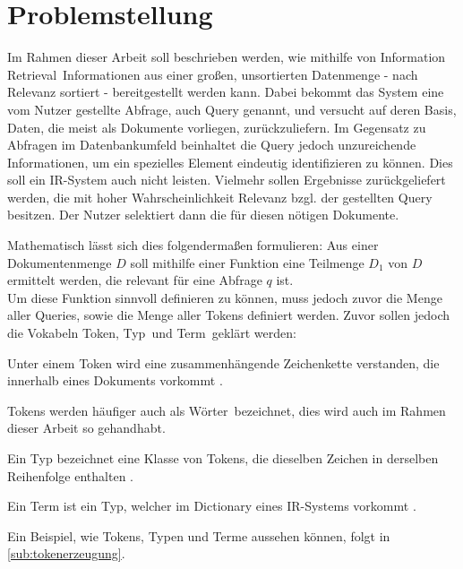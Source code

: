 \section{Problemstellung}
Im Rahmen dieser Arbeit soll beschrieben werden, wie mithilfe von \glqq Information Retrieval\grqq\ Informationen aus einer großen, unsortierten Datenmenge - nach Relevanz sortiert - bereitgestellt werden kann. Dabei bekommt das System eine vom Nutzer gestellte Abfrage, auch Query genannt, und versucht auf deren Basis, Daten, die meist als Dokumente vorliegen, zurückzuliefern. Im Gegensatz zu Abfragen im Datenbankumfeld beinhaltet die Query jedoch unzureichende Informationen, um ein spezielles Element eindeutig identifizieren zu können. Dies soll ein IR-System auch nicht leisten. Vielmehr sollen Ergebnisse zurückgeliefert werden, die mit hoher Wahrscheinlichkeit Relevanz bzgl. der gestellten Query besitzen. Der Nutzer selektiert dann die für diesen nötigen Dokumente.

Mathematisch lässt sich dies folgendermaßen formulieren: Aus einer Dokumentenmenge $D$ soll mithilfe einer Funktion eine Teilmenge $D_1$ von $D$ ermittelt werden, die relevant für eine Abfrage $q$ ist.
\\
Um diese Funktion sinnvoll definieren zu können, muss jedoch zuvor die Menge aller Queries, sowie die Menge aller Tokens definiert werden. Zuvor sollen jedoch die Vokabeln \glqq Token\grqq, \glqq Typ\grqq\ und \glqq Term\grqq\ geklärt werden:

\begin{defi}[Token]\label{def:Token}
	Unter einem Token wird eine zusammenhängende Zeichenkette verstanden, die innerhalb eines Dokuments vorkommt \cite{IR_Intro_Cambridge}.
\end{defi}

Tokens werden häufiger auch als \glqq Wörter\grqq\ bezeichnet, dies wird auch im Rahmen dieser Arbeit so gehandhabt.

\begin{defi}[Typ]\label{def:Typ}
	Ein Typ bezeichnet eine Klasse von Tokens, die dieselben Zeichen in derselben Reihenfolge enthalten \cite{IR_Intro_Cambridge}.
\end{defi}
\begin{defi}[Term]\label{def:Term}
	Ein Term ist ein Typ, welcher im Dictionary eines IR-Systems vorkommt \cite{IR_Intro_Cambridge}.
\end{defi}

Ein Beispiel, wie Tokens, Typen und Terme aussehen können, folgt in \ref{sub:tokenerzeugung}.

